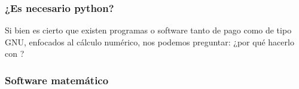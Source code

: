 \documentclass[12pt]{beamer}
\begin{document}
\begin{frame}
\frametitle{¿Es necesario python?}
Si bien es cierto que existen programas o software tanto de pago como de tipo GNU, enfocados al cálculo numérico, \pause nos podemos preguntar: ¿por qué hacerlo con \python?
\end{frame}
\begin{frame}
\frametitle{Software matemático}
\begin{figure}
    \centering

\end{figure}
\end{frame}
\end{document}
